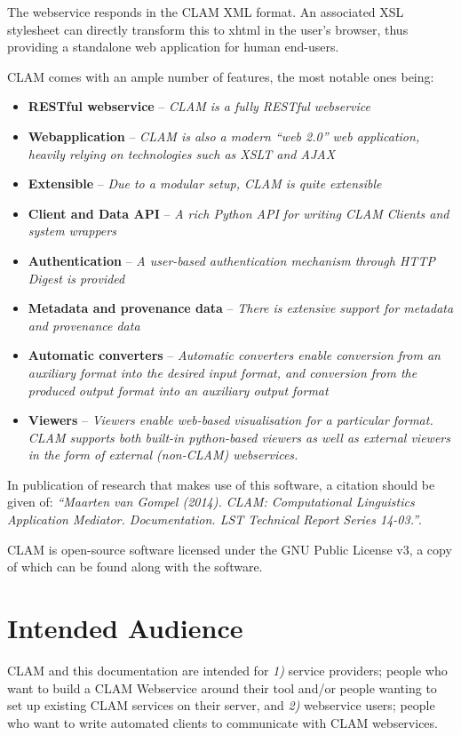 \documentclass[a4paper,12pt]{report}
\begin{document}
The webservice responds in the CLAM XML format. An associated XSL stylesheet
\citep{XSLT} can directly transform this to xhtml in the user's browser, thus
providing a standalone web application for human end-users. 

CLAM comes with an ample number of features, the most notable ones being:

\begin{itemize}
\item \textbf{RESTful webservice} -- \emph{CLAM is a fully RESTful webservice}
\item \textbf{Webapplication} -- \emph{CLAM is also a modern ``web 2.0'' web application, heavily relying on technologies such as XSLT and AJAX}
\item \textbf{Extensible} -- \emph{Due to a modular setup, CLAM is quite extensible}
\item \textbf{Client and Data API} -- \emph{A rich Python API for writing CLAM Clients and system wrappers}
\item \textbf{Authentication} -- \emph{A user-based authentication mechanism through HTTP Digest is provided}
\item \textbf{Metadata and provenance data} -- \emph{There is extensive support for metadata and provenance data}
\item \textbf{Automatic converters} -- \emph{Automatic converters enable conversion from an auxiliary format into the desired input format, and conversion from the produced output format into an auxiliary output format}
\item \textbf{Viewers} -- \emph{Viewers enable web-based visualisation for a particular format. CLAM supports both built-in python-based viewers as well as external viewers in the form of external (non-CLAM) webservices.}
\end{itemize}

In publication of research that makes use of this software, a citation should
be given of: {\em ``Maarten van Gompel (2014). CLAM: Computational Linguistics
Application Mediator. Documentation. LST Technical Report Series 14-03.''}.

CLAM is open-source software licensed under the GNU Public License v3, a copy
of which can be found along with the software.

\section{Intended Audience}

CLAM and this documentation are intended for \emph{1)} service providers;
people who want to build a CLAM Webservice around their tool and/or people
wanting to set up existing CLAM services on their server, and \emph{2)}
webservice users; people who want to write automated clients to communicate
with CLAM webservices. 
\end{document}
